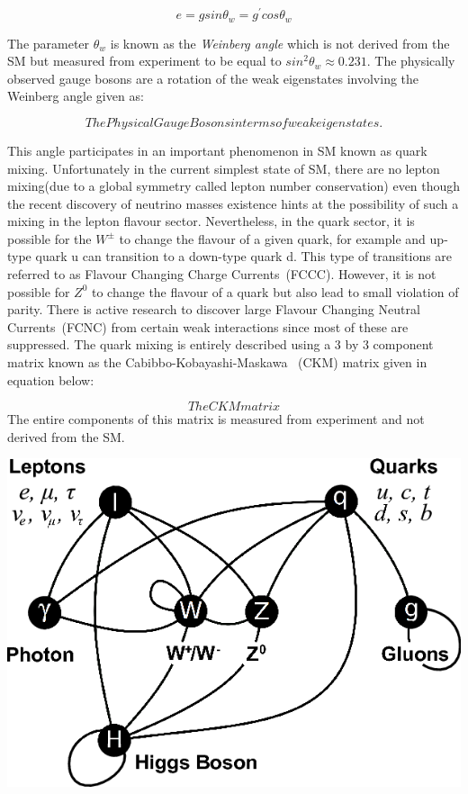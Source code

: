 \begin{equation}
e = g sin \theta_{w} = g^{\prime} cos \theta_{w}
\end{equation} 

The parameter $\theta_{w}$ is known as the \textit{Weinberg angle} which is not derived from the SM but measured from experiment to be equal to $sin^{2}\theta_{w} \approx 0.231 $.
The physically observed gauge bosons are a rotation of the weak eigenstates involving the Weinberg angle given as:

\begin{equation}
The Physical Gauge Bosons in terms of weak eigen states.
\end{equation}

This angle participates in an important phenomenon in SM known as quark mixing. Unfortunately in the current simplest state of SM, there are no lepton mixing(due to a global symmetry called lepton number conservation) even though the recent discovery of neutrino masses existence \cite{} hints at the possibility of such a mixing in the lepton flavour sector.
Nevertheless, in the quark sector, it is possible for the $W^{\pm}$ to change the flavour of a given quark, for example and up-type quark u can transition to a down-type quark d. This type of transitions are referred to as Flavour Changing Charge Currents~(FCCC). However, it is not possible for $Z^{0}$ to change the flavour of a quark but also lead to small violation of parity. There is active research to discover large Flavour Changing Neutral Currents~(FCNC) from certain  weak interactions since most of these are suppressed.
The quark mixing is entirely described using a 3 by 3 component matrix known as the Cabibbo-Kobayashi-Maskawa ~(CKM) matrix given in equation below:

\begin{equation}
The CKM matrix
\end{equation}
The entire components of this matrix is measured from experiment and not derived from the SM.
\begin{center}
\centering
\includegraphics[scale=0.3]{THESISPLOTS/SM_Particles.png}
\label{fig:ALLSM}
\end{center}



